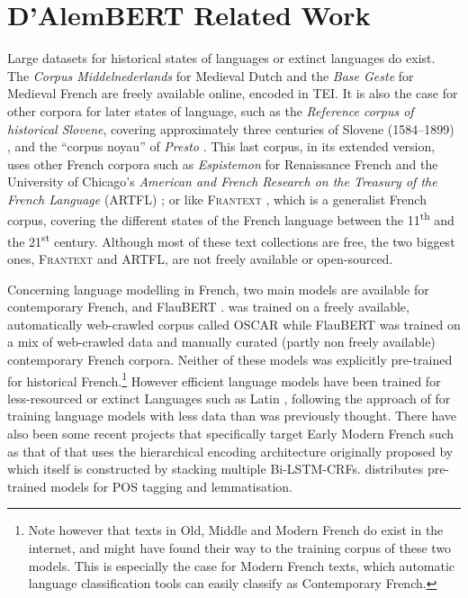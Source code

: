 \section{D'AlemBERT Related Work}


Large datasets for historical states of languages or  extinct languages do exist. The \emph{Corpus Middelnederlands} for Medieval Dutch \citep{reenen-etal-1998-corpus} and the \emph{Base Geste} for Medieval French \citep{camps-etal-2019-geste} are freely available online, encoded in TEI. It is also the case for other corpora for later states of language, such as the \emph{Reference corpus of historical Slovene}, covering approximately three centuries of Slovene (1584--1899)  \citep{erjavec-2015-reference}, and the ``corpus noyau'' of \emph{Presto} \citep{blumenthal-2018-presto}. This last corpus, in its extended version, uses other French corpora such as \emph{Espistemon} for Renaissance French \citep{demonet-1998-epistemon} and the University of Chicago's \emph{American and French Research on the Treasury of the French Language} (ARTFL) \citep{morrissey-olsen-1991-american}; or like \textsc{Frantext} \citep{atilf-1998-frantext}, which is a generalist French corpus, covering the different states of the French language between the 11\textsuperscript{th} and the 21\textsuperscript{st} century. Although most of these text collections are free, the two biggest ones, \textsc{Frantext} and ARTFL, are not freely available or open-sourced.

Concerning language modelling in French, two main models are available for contemporary French, \camembert \cite{martin-etal-2020-camembert} and FlauBERT \cite{le-etal-2020-flaubert}. \camembert was trained on a freely available, automatically web-crawled corpus called OSCAR \cite{ortiz-suarez-etal-2019-asynchronous,ortiz-suarez-etal-2020-monolingual} while FlauBERT was trained on a mix of web-crawled data and manually curated (partly non freely available) contemporary French corpora. Neither of these models was explicitly pre-trained for historical French.\footnote{Note however that texts in Old, Middle and Modern French do exist in the internet, and might have found their way to the training corpus of these two models. This is especially the case for Modern French texts, which automatic language classification tools can easily classify as Contemporary French.} However efficient language models have been trained for less-resourced or extinct Languages such as Latin \cite{bamman-burns-2020-latin}, following the approach of  for training language models with less data than was previously thought. There have also been some recent projects that specifically target Early Modern French such as that of \pieextended \cite{clerice-2020-pie} that uses the hierarchical encoding architecture originally proposed by  which itself is constructed by stacking multiple Bi-LSTM-CRFs.  distributes pre-trained models for POS tagging and lemmatisation.

